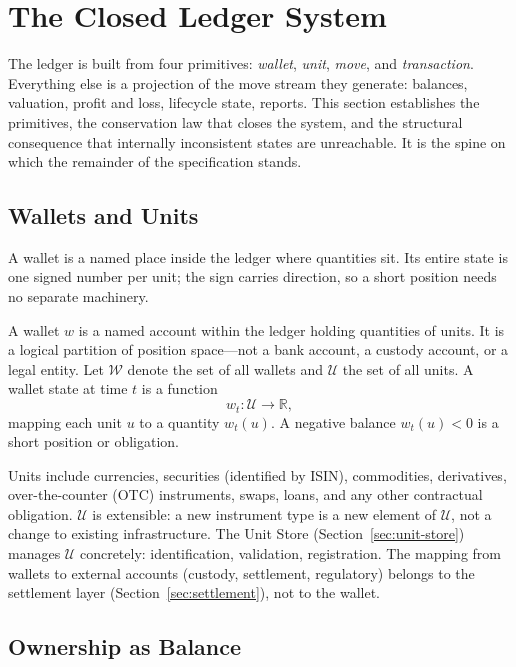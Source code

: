 \section{The Closed Ledger System}
\label{sec:ledger}

The ledger is built from four primitives: \emph{wallet}, \emph{unit}, \emph{move}, and \emph{transaction}. Everything else is a projection of the move stream they generate: balances, valuation, profit and loss, lifecycle state, reports. This section establishes the primitives, the conservation law that closes the system, and the structural consequence that internally inconsistent states are unreachable. It is the spine on which the remainder of the specification stands.

\subsection{Wallets and Units}

A wallet is a named place inside the ledger where quantities sit. Its entire state is one signed number per unit; the sign carries direction, so a short position needs no separate machinery.

\begin{definition}[Wallet]
A wallet $w$ is a named account within the ledger holding quantities of units. It is a logical partition of position space---not a bank account, a custody account, or a legal entity. Let $\mathcal{W}$ denote the set of all wallets and $\mathcal{U}$ the set of all units. A wallet state at time $t$ is a function
\[
w_t : \mathcal{U} \to \mathbb{R},
\]
mapping each unit $u$ to a quantity $w_t(u)$. A negative balance $w_t(u) < 0$ is a short position or obligation.
\end{definition}

Units include currencies, securities (identified by ISIN), commodities, derivatives, over-the-counter (OTC) instruments, swaps, loans, and any other contractual obligation. $\mathcal{U}$ is extensible: a new instrument type is a new element of $\mathcal{U}$, not a change to existing infrastructure. The Unit Store (Section~\ref{sec:unit-store}) manages $\mathcal{U}$ concretely: identification, validation, registration. The mapping from wallets to external accounts (custody, settlement, regulatory) belongs to the settlement layer (Section~\ref{sec:settlement}), not to the wallet.

\subsection{Ownership as Balance}

